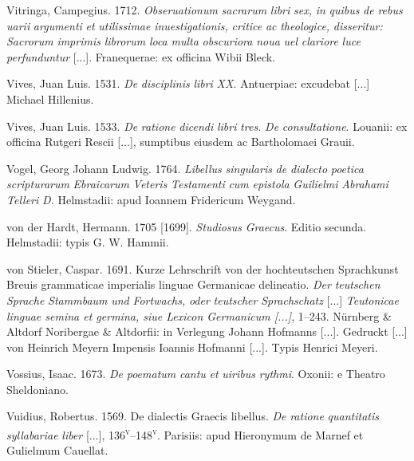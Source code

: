 \documentclass[output=paper]{langsci/langscibook}
\begin{document}
Vitringa, Campegius. 1712. \textit{Obseruationum} \textit{sacrarum} \textit{libri} \textit{sex,} \textit{in} \textit{quibus} \textit{de} \textit{rebus} \textit{uarii} \textit{argumenti} \textit{et} \textit{utilissimae} \textit{inuestigationis,} \textit{critice} \textit{ac} \textit{theologice,} \textit{disseritur:} \textit{Sacrorum} \textit{imprimis} \textit{librorum} \textit{loca} \textit{multa} \textit{obscuriora} \textit{noua} \textit{uel} \textit{clariore} \textit{luce} \textit{perfunduntur} [...]. Franequerae: ex officina Wibii Bleck.

Vives, Juan Luis. 1531. \textit{De} \textit{disciplinis} \textit{libri} \textit{XX}. Antuerpiae: excudebat [...] Michael Hillenius.

Vives, Juan Luis. 1533. \textit{De} \textit{ratione} \textit{dicendi} \textit{libri} \textit{tres.} \textit{De} \textit{consultatione}. Louanii: ex officina Rutgeri Rescii [...], sumptibus eiusdem ac Bartholomaei Grauii.

Vogel, Georg Johann Ludwig. 1764. \textit{Libellus} \textit{singularis} \textit{de} \textit{dialecto} \textit{poetica} \textit{scripturarum} \textit{Ebraicarum} \textit{Veteris} \textit{Testamenti} \textit{cum} \textit{epistola} \textit{Guilielmi} \textit{Abrahami} \textit{Telleri} \textit{D.} Helmstadii: apud Ioannem Fridericum Weygand.

von der Hardt, Hermann. 1705 [1699]. \textit{Studiosus} \textit{Graecus}. Editio secunda. Helmstadii: typis G. W. Hammii.

von Stieler, Caspar. 1691. Kurze Lehrschrift von der hochteutschen Sprachkunst {\textbar} Breuis grammaticae imperialis linguae Germanicae delineatio. \textit{Der} \textit{teutschen} \textit{Sprache} \textit{Stammbaum} \textit{und} \textit{Fortwachs,} \textit{oder} \textit{teutscher} \textit{Sprachschatz} [...] \textit{{\textbar} Teutonicae linguae semina et germina, siue Lexicon Germanicum [...]}, 1–243. Nürnberg \& Altdorf {\textbar} Noribergae \& Altdorfii: in Verlegung Johann Hofmanns [...]. Gedruckt [...] von Heinrich Meyern {\textbar} Impensis Ioannis Hofmanni [...]. Typis Henrici Meyeri.

Vossius, Isaac. 1673. \textit{De} \textit{poematum} \textit{cantu} \textit{et} \textit{uiribus} \textit{rythmi}. Oxonii: e Theatro Sheldoniano.

Vuidius, Robertus. 1569. De dialectis Graecis libellus. \textit{De} \textit{ratione} \textit{quantitatis} \textit{syllabariae} \textit{liber} [...], 136\textsc{\textsuperscript{v}}–148\textsc{\textsuperscript{v}}. Parisiis: apud Hieronymum de Marnef et Gulielmum Cauellat.
\end{document}
